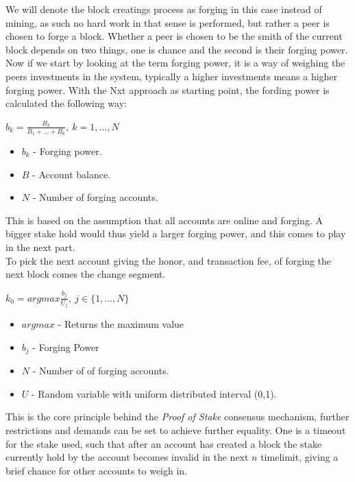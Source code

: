 \documentclass[paper=a4, fontsize=11pt]{scrartcl} %
\numberwithin{equation}{section} %
\numberwithin{figure}{section} %
\numberwithin{table}{section} %
\begin{document}
We will denote the block creatings process as forging in this case instead of mining, as such no hard work in that sense is performed, but rather a peer is chosen to forge a block. Whether a peer is chosen to be the smith of the current block depends on two things, one is chance and the second is their forging power. Now if we start by looking at the term forging power, it is a way of weighing the peers investments in the system, typically a higher investments means a higher forging power. With the Nxt approach as starting point, the fording power is calculated the following way:\cite{stake}

\begin{center}
$b_k = \frac{B_k}{B_1+...+B_k},\ k=1,...,N$
\end{center}

\begin{itemize}
\item $b_k$ - Forging power.
\item $B$ - Account balance.
\item $N$ - Number of forging accounts.
\end{itemize}

This is based on the assumption that all accounts are online and forging. A bigger stake hold would thus yield a larger forging power, and this comes to play in the next part.\\
To pick the next account giving the honor, and transaction fee, of forging the next block comes the change segment. 

\begin{center}
$k_0 = argmax\frac{b_j}{U_j},\ j \in \{1,...,N\}$
\end{center}

\begin{itemize}
\item $argmax$ - Returns the maximum value
\item $b_j$ - Forging Power
\item $N$ - Number of of forging accounts.
\item $U$ - Random variable with uniform distributed interval (0,1).
\end{itemize}

This is the core principle behind the \textit{Proof of Stake} consensus mechanism, further restrictions and demands can be set to achieve further equality. One is a timeout for the stake used, such that after an account has created a block the stake currently hold by the account becomes invalid in the next $n$ timelimit, giving a brief chance for other accounts to weigh in.\\
\end{document}
